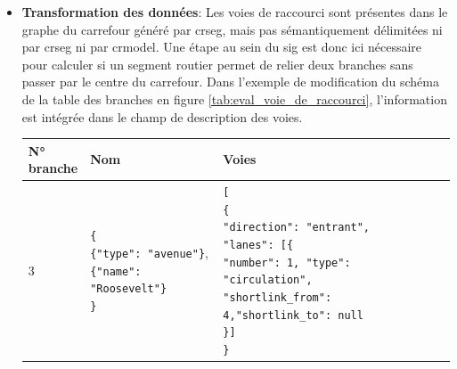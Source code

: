 \begin{itemize}
    \item \textbf{Transformation des données}: Les voies de raccourci sont présentes dans le graphe du carrefour généré par crseg, mais pas sémantiquement délimitées ni par crseg ni par crmodel. Une étape au sein du \gls{sig} est donc ici nécessaire pour calculer si un segment routier permet de relier deux branches sans passer par le centre du carrefour. Dans l'exemple de modification du schéma de la table des branches en figure \ref{tab:eval_voie_de_raccourci}, l'information est intégrée dans le champ de description des voies.
    \begin{table}[ht]
        \begin{center}
            \footnotesize
            \begin{tabular}{ | l | l | l | }
                \makecell{\textbf{N°}\\\textbf{branche}} & \textbf{Nom} & \textbf{Voies}\\
                \hline
                3 &
                \makecell{
                    \texttt{\{}\\
                    \hspace{0.5cm}\texttt{\{"type": "avenue"\}},\\
                    \hspace{0.5cm}\texttt{\{"name": "Roosevelt"\}}\\
                    \texttt\}
                } &
                \makecell{
                    \texttt[\\
                    \hspace{0.5cm}\texttt{\{}\\
                    \hspace{1cm}\texttt{"direction": "entrant",}\\
                    \hspace{1cm}\texttt{"lanes": [\{}\\
                    \hspace{1.5cm}\texttt{"number": 1, "type": "circulation",}\\
                    \hspace{1.5cm}\texttt{"shortlink\_from": 4,}\texttt{"shortlink\_to": null}\\
                    \hspace{1cm}\texttt{\}]}\\
                    \hspace{0.5cm}\texttt\}\\
}
\end{tabular}
\end{center}
\end{table}
\end{itemize}

